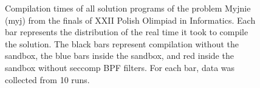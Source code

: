 \documentclass[en]{pracamgr}
\begin{document}
\begin{appendices}
\begin{figure}[H]
\caption{Compilation times of all solution programs of the problem Myjnie (myj) from the finals of XXII Polish Olimpiad in Informatics. Each bar represents the distribution of the real time it took to compile the solution. The black bars represent compilation without the sandbox, the blue bars inside the sandbox, and red inside the sandbox without seccomp BPF filters. For each bar, data was collected from 10 runs.}
\label{figure:myj_compilation_real_time}
\end{figure}


\end{appendices}
\end{document}
